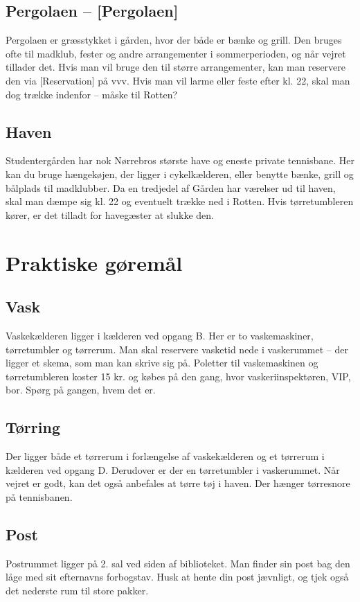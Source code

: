 \documentclass[11pt,article,twoside,openany,danish,extrafontsizes]{memoir} %
\begin{document}
\subsection{Pergolaen -- [Pergolaen]}
Pergolaen er græsstykket i gården, hvor der både er bænke og grill. Den bruges ofte til madklub, fester og andre arrangementer i sommerperioden, og når vejret tillader det. Hvis man vil bruge den til større arrangementer, kan man reservere den via [Reservation] på vvv. Hvis man vil larme eller feste efter kl. 22, skal man dog trække indenfor -- måske til Rotten?

\subsection{Haven}
Studentergården har nok Nørrebros største have og eneste private tennisbane. Her kan du bruge hængekøjen, der ligger i cykelkælderen, eller benytte bænke, grill og bålplads til madklubber. Da en tredjedel af Gården har værelser ud til haven, skal man dæmpe sig kl. 22 og eventuelt trække ned i Rotten. Hvis tørretumbleren kører, er det tilladt for havegæster at slukke den.





\section{Praktiske gøremål}

\subsection{Vask}
Vaskekælderen ligger i kælderen ved opgang B. Her er to vaskemaskiner, tørretumbler og tørrerum. Man skal reservere vasketid nede i vaskerummet -- der ligger et skema, som man kan skrive sig på. Poletter til vaskemaskinen og tørretumbleren koster 15 kr. og købes på den gang, hvor vaskeriinspektøren, VIP, bor. Spørg på gangen, hvem det er.

\subsection{Tørring}
Der ligger både et tørrerum i forlængelse af vaskekælderen og et tørrerum i kælderen ved opgang D. Derudover er der en tørretumbler i vaskerummet. Når vejret er godt, kan det også anbefales at tørre tøj i haven. Der hænger tørresnore på tennisbanen.

\subsection{Post}
Postrummet ligger på 2. sal ved siden af biblioteket. Man finder sin post bag den låge med sit efternavns forbogstav. Husk at hente din post jævnligt, og tjek også det nederste rum til store pakker.
\end{document}
